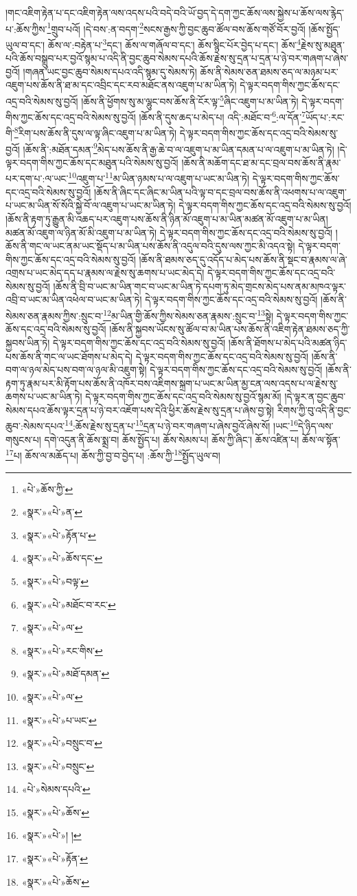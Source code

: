 །གང་འཇིག་རྟེན་པ་དང་འཇིག་རྟེན་ལས་འདས་པའི་བདེ་བའི་ཡོ་བྱད་དེ་དག་ཀྱང་ཆོས་ལས་སྐྱེས་པ་ཆོས་ལས་རྙེད་པ་:ཆོས་ཀྱིས་\footnote{«པེ་»ཆོས་ཀྱི་}གྲུབ་པའོ། །དེ་བས་:ན་བདག་\footnote{«སྣར་»«པེ་»ན་}སངས་རྒྱས་ཀྱི་བྱང་ཆུབ་ཚོལ་བས་ཆོས་གཙོ་བོར་བྱའོ། །ཆོས་སྤྱོད་ཡུལ་བ་དང་། ཆོས་ལ་:བརྟེན་པ་\footnote{«སྣར་»«པེ་»རྟོན་པ་}དང་། ཆོས་ལ་གཞོལ་བ་དང་། ཆོས་སྙིང་པོར་བྱེད་པ་དང་། ཆོས་\footnote{«སྣར་»«པེ་»ཆོས་དང་}རྗེས་སུ་མཐུན་པའི་ཆོས་བསྒྲུབ་པར་བྱའོ་སྙམ་པ་འདི་ནི་བྱང་ཆུབ་སེམས་དཔའི་ཆོས་རྗེས་སུ་དྲན་པ་དྲན་པ་ཉེ་བར་གཞག་པ་ཞེས་བྱའོ། །གཞན་ཡང་བྱང་ཆུབ་སེམས་དཔའ་འདི་སྙམ་དུ་སེམས་ཏེ། ཆོས་ནི་སེམས་ཅན་ཐམས་ཅད་ལ་མཉམ་པར་འཇུག་པས་ཆོས་ནི་ཐ་མ་དང་འབྲིང་དང་རབ་མཐོང་ནས་འཇུག་པ་མ་ཡིན་ཏེ། དེ་ལྟར་བདག་གིས་ཀྱང་ཆོས་དང་འདྲ་བའི་སེམས་སུ་བྱའོ། །ཆོས་ནི་ཕྱོགས་སུ་མ་ལྷུང་བས་ཆོས་ནི་ངོར་ལྟ་\footnote{«སྣར་»«པེ་»བལྟ་}ཞིང་འཇུག་པ་མ་ཡིན་ཏེ། དེ་ལྟར་བདག་གིས་ཀྱང་ཆོས་དང་འདྲ་བའི་སེམས་སུ་བྱའོ། །ཆོས་ནི་དུས་ཆད་པ་མེད་པ། འདི་:མཐོང་བ་\footnote{«སྣར་»«པེ་»མཐོང་བ་རང་}:ལ་དོན་\footnote{«སྣར་»«པེ་»ལ་}ཡོད་པ་:རང་གི་\footnote{«སྣར་»«པེ་»རང་གིས་}རིག་པས་ཆོས་ནི་དུས་ལ་ལྟ་ཞིང་འཇུག་པ་མ་ཡིན་ཏེ། དེ་ལྟར་བདག་གིས་ཀྱང་ཆོས་དང་འདྲ་བའི་སེམས་སུ་བྱའོ། །ཆོས་ནི་:མཐོན་དམན་\footnote{«སྣར་»«པེ་»མཐོ་དམན་}མེད་པས་ཆོས་ནི་རྒྱ་ཆེ་བ་ལ་འཇུག་པ་མ་ཡིན་དམན་པ་ལ་འཇུག་པ་མ་ཡིན་ཏེ། །དེ་ལྟར་བདག་གིས་ཀྱང་ཆོས་དང་མཐུན་པའི་སེམས་སུ་བྱའོ། །ཆོས་ནི་མཆོག་དང་ཐ་མ་དང་བྲལ་བས་ཆོས་ནི་རྣམ་པར་དག་པ་:ལ་ཡང་\footnote{«སྣར་»«པེ་»ལ་}འཇུག་པ་\footnote{«སྣར་»«པེ་»པ་ཡང་}མ་ཡིན་ཉམས་པ་ལ་འཇུག་པ་ཡང་མ་ཡིན་ཏེ། དེ་ལྟར་བདག་གིས་ཀྱང་ཆོས་དང་འདྲ་བའི་སེམས་སུ་བྱའོ། །ཆོས་ནི་ཞིང་དང་ཞིང་མ་ཡིན་པའི་ལྟ་བ་དང་བྲལ་བས་ཆོས་ནི་འཕགས་པ་ལ་འཇུག་པ་ཡང་མ་ཡིན་སོ་སོའི་སྐྱེ་བོ་ལ་འཇུག་པ་ཡང་མ་ཡིན་ཏེ། དེ་ལྟར་བདག་གིས་ཀྱང་ཆོས་དང་འདྲ་བའི་སེམས་སུ་བྱའོ། །ཆོས་ནི་རྟག་ཏུ་རྒྱུན་མི་འཆད་པར་འཇུག་པས་ཆོས་ནི་ཉིན་མོ་འཇུག་པ་མ་ཡིན་མཚན་མོ་འཇུག་པ་མ་ཡིན། མཚན་མོ་འཇུག་ལ་ཉིན་མོ་མི་འཇུག་པ་མ་ཡིན་ཏེ། དེ་ལྟར་བདག་གིས་ཀྱང་ཆོས་དང་འདྲ་བའི་སེམས་སུ་བྱའོ། །ཆོས་ནི་གང་ལ་ཡང་ནམ་ཡང་སྡོད་པ་མ་ཡིན་པས་ཆོས་ནི་འདུལ་བའི་དུས་ལས་ཀྱང་མི་འདའ་སྟེ། དེ་ལྟར་བདག་གིས་ཀྱང་ཆོས་དང་འདྲ་བའི་སེམས་སུ་བྱའོ། །ཆོས་ནི་ཐམས་ཅད་དུ་འདོད་པ་མེད་པས་ཆོས་ནི་སྡང་བ་རྣམས་ལ་ཞེ་འགྲས་པ་ཡང་མེད་དད་པ་རྣམས་ལ་རྗེས་སུ་ཆགས་པ་ཡང་མེད་དེ། དེ་ལྟར་བདག་གིས་ཀྱང་ཆོས་དང་འདྲ་བའི་སེམས་སུ་བྱའོ། །ཆོས་ནི་བྲི་བ་ཡང་མ་ཡིན་གང་བ་ཡང་མ་ཡིན་ཏེ་དཔག་ཏུ་མེད་གྲངས་མེད་པས་ནམ་མཁའ་ལྟར་འབྲི་བ་ཡང་མ་ཡིན་འཕེལ་བ་ཡང་མ་ཡིན་ཏེ། དེ་ལྟར་བདག་གིས་ཀྱང་ཆོས་དང་འདྲ་བའི་སེམས་སུ་བྱའོ། །ཆོས་ནི་སེམས་ཅན་རྣམས་ཀྱིས་:སྲུང་བ་\footnote{«སྣར་»«པེ་»བསྲུང་བ་}མ་ཡིན་གྱི་ཆོས་ཀྱིས་སེམས་ཅན་རྣམས་:སྲུང་བ་\footnote{«སྣར་»«པེ་»བསྲུང་}སྟེ། དེ་ལྟར་བདག་གིས་ཀྱང་ཆོས་དང་འདྲ་བའི་སེམས་སུ་བྱའོ། །ཆོས་ནི་སྐྱབས་ཡོངས་སུ་ཚོལ་བ་མ་ཡིན་པས་ཆོས་ནི་འཇིག་རྟེན་ཐམས་ཅད་ཀྱི་སྐྱབས་ཡིན་ཏེ། དེ་ལྟར་བདག་གིས་ཀྱང་ཆོས་དང་འདྲ་བའི་སེམས་སུ་བྱའོ། །ཆོས་ནི་ཐོགས་པ་མེད་པའི་མཚན་ཉིད་པས་ཆོས་ནི་གང་ལ་ཡང་ཐོགས་པ་མེད་དེ། དེ་ལྟར་བདག་གིས་ཀྱང་ཆོས་དང་འདྲ་བའི་སེམས་སུ་བྱའོ། །ཆོས་ནི་བག་ལ་ཉལ་མེད་པས་བག་ལ་ཉལ་མི་འཇུག་སྟེ། དེ་ལྟར་བདག་གིས་ཀྱང་ཆོས་དང་འདྲ་བའི་སེམས་སུ་བྱའོ། །ཆོས་ནི་རྟག་ཏུ་རྣམ་པར་མི་རྟོག་པས་ཆོས་ནི་འཁོར་བས་འཇིགས་སྐྲག་པ་ཡང་མ་ཡིན་མྱ་ངན་ལས་འདས་པ་ལ་རྗེས་སུ་ཆགས་པ་ཡང་མ་ཡིན་ཏེ། དེ་ལྟར་བདག་གིས་ཀྱང་ཆོས་དང་འདྲ་བའི་སེམས་སུ་བྱའོ་སྙམ་མོ། །དེ་ལྟར་ན་བྱང་ཆུབ་སེམས་དཔའ་ཆོས་ལྟར་དྲན་པ་ཉེ་བར་འཇོག་པས་དེའི་ཕྱིར་ཆོས་རྗེས་སུ་དྲན་པ་ཞེས་བྱ་སྟེ། རིགས་ཀྱི་བུ་འདི་ནི་བྱང་ཆུབ་:སེམས་དཔའ་\footnote{«པེ་»སེམས་དཔའི་}:ཆོས་རྗེས་སུ་དྲན་པ་\footnote{«སྣར་»«པེ་»ཆོས་}དྲན་པ་ཉེ་བར་གཞག་པ་ཞེས་བྱའོ་ཞེས་སོ། །ཡང་\footnote{«སྣར་»«པེ་»། །}དེ་ཉིད་ལས་གསུངས་པ། དགེ་འདུན་ནི་ཆོས་སྨྲ་བ། ཆོས་སྤྱོད་པ། ཆོས་སེམས་པ། ཆོས་ཀྱི་ཞིང་། ཆོས་འཛིན་པ། ཆོས་ལ་སྟོན་\footnote{«སྣར་»«པེ་»རྟོན་}པ། ཆོས་ལ་མཆོད་པ། ཆོས་ཀྱི་བྱ་བ་བྱེད་པ། :ཆོས་ཀྱི་\footnote{«སྣར་»«པེ་»ཆོས་}སྤྱོད་ཡུལ་བ། 